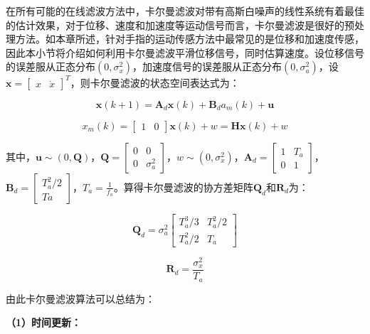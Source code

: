 在所有可能的在线滤波方法中，卡尔曼滤波对带有高斯白噪声的线性系统有着最佳的估计效果\cite{humpherys2012fresh}，对于位移、速度和加速度等运动信号而言，卡尔曼滤波是很好的预处理方法。如本章所述，针对手指的运动传感方法中最常见的是位移和加速度传感，因此本小节将介绍如何利用卡尔曼滤波平滑位移信号，同时估算速度。设位移信号的误差服从正态分布$(0,\sigma_x^2)$，加速度信号的误差服从正态分布$(0,\sigma_a^2)$，设$\boldsymbol{x}=\begin{bmatrix}x&\dot{x}\end{bmatrix}^T$，则卡尔曼滤波的状态空间表达式为：

\begin{equation}
\boldsymbol{x}(k+1)=\boldsymbol{A}_d\boldsymbol{x}(k)+\boldsymbol{B}_d a_m(k)+\boldsymbol{u}
\end{equation}

\begin{equation}
x_m(k)=
\begin{bmatrix}
1 & 0
\end{bmatrix}
\boldsymbol{x}(k)+w
=\boldsymbol{H}\boldsymbol{x}(k)+w
\end{equation}

其中，$\boldsymbol{u}\sim(0,\boldsymbol{Q})$，$\boldsymbol{Q}=\begin{bmatrix}0&0\\0&\sigma_a^2\end{bmatrix}$，$w\sim(0,\sigma_x^2)$，$\boldsymbol{A}_d=\begin{bmatrix}1&T_a\\0&1\end{bmatrix}$，$\boldsymbol{B}_d=\begin{bmatrix}T_a^2/2\\Ta\end{bmatrix}$，$T_a=\frac{1}{f_a}$。算得卡尔曼滤波的协方差矩阵$\boldsymbol{Q}_d$和$\boldsymbol{R}_d$为\cite{lewis1986optimal}：

\begin{equation}
\boldsymbol{Q}_d=\sigma_a^2
\begin{bmatrix}
T_a^3/3 & T_a^2/2 \\
T_a^2/2 & T_a
\end{bmatrix}
\end{equation}

\begin{equation}
\boldsymbol{R}_d=\frac{\sigma_x^2}{T_a}
\end{equation}

由此卡尔曼滤波算法可以总结为：

\textbf{（1）时间更新：}

